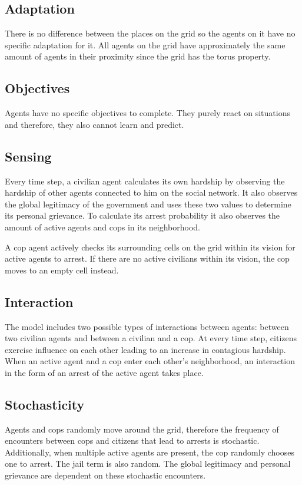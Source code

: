 \documentclass[10pt]{article}
\begin{document}
    \subsection{Adaptation}
    There is no difference between the places on the grid so the agents on it have no specific adaptation for it. All agents on the grid have approximately the same amount of agents in their proximity since the grid has the torus property.

    \subsection{Objectives}
    Agents have no specific objectives to complete. They purely react on situations and therefore, they also cannot learn and predict.

    \subsection{Sensing}
    Every time step, a civilian agent calculates its own hardship by observing the hardship of other agents connected to him on the social network. It also observes the global legitimacy of the government and uses these two values to determine its personal grievance. To calculate its arrest probability it also observes the amount of active agents and cops in its neighborhood.

    A cop agent actively checks its surrounding cells on the grid within its vision for active agents to arrest. If there are no active civilians within its vision, the cop moves to an empty cell instead.

    \subsection{Interaction}
    The model includes two possible types of interactions between agents: between two civilian agents and between a civilian and a cop. At every time step, citizens exercise influence on each other leading to an increase in contagious hardship. When an active agent and a cop enter each other's neighborhood, an interaction in the form of an arrest of the active agent takes place.

    \subsection{Stochasticity}
    Agents and cops randomly move around the grid, therefore the frequency of encounters between cops and citizens that lead to arrests is stochastic. Additionally, when multiple active agents are present, the cop randomly chooses one to arrest. The jail term is also random. The global legitimacy and personal grievance are dependent on these stochastic encounters.
\end{document}
